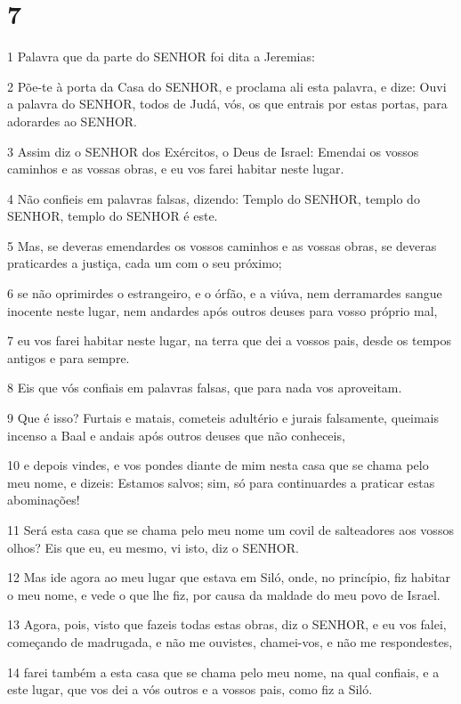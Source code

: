 \chapter{7}

\par 1 Palavra que da parte do SENHOR foi dita a Jeremias:
\par 2 Põe-te à porta da Casa do SENHOR, e proclama ali esta palavra, e dize: Ouvi a palavra do SENHOR, todos de Judá, vós, os que entrais por estas portas, para adorardes ao SENHOR.
\par 3 Assim diz o SENHOR dos Exércitos, o Deus de Israel: Emendai os vossos caminhos e as vossas obras, e eu vos farei habitar neste lugar.
\par 4 Não confieis em palavras falsas, dizendo: Templo do SENHOR, templo do SENHOR, templo do SENHOR é este.
\par 5 Mas, se deveras emendardes os vossos caminhos e as vossas obras, se deveras praticardes a justiça, cada um com o seu próximo;
\par 6 se não oprimirdes o estrangeiro, e o órfão, e a viúva, nem derramardes sangue inocente neste lugar, nem andardes após outros deuses para vosso próprio mal,
\par 7 eu vos farei habitar neste lugar, na terra que dei a vossos pais, desde os tempos antigos e para sempre.
\par 8 Eis que vós confiais em palavras falsas, que para nada vos aproveitam.
\par 9 Que é isso? Furtais e matais, cometeis adultério e jurais falsamente, queimais incenso a Baal e andais após outros deuses que não conheceis,
\par 10 e depois vindes, e vos pondes diante de mim nesta casa que se chama pelo meu nome, e dizeis: Estamos salvos; sim, só para continuardes a praticar estas abominações!
\par 11 Será esta casa que se chama pelo meu nome um covil de salteadores aos vossos olhos? Eis que eu, eu mesmo, vi isto, diz o SENHOR.
\par 12 Mas ide agora ao meu lugar que estava em Siló, onde, no princípio, fiz habitar o meu nome, e vede o que lhe fiz, por causa da maldade do meu povo de Israel.
\par 13 Agora, pois, visto que fazeis todas estas obras, diz o SENHOR, e eu vos falei, começando de madrugada, e não me ouvistes, chamei-vos, e não me respondestes,
\par 14 farei também a esta casa que se chama pelo meu nome, na qual confiais, e a este lugar, que vos dei a vós outros e a vossos pais, como fiz a Siló.
